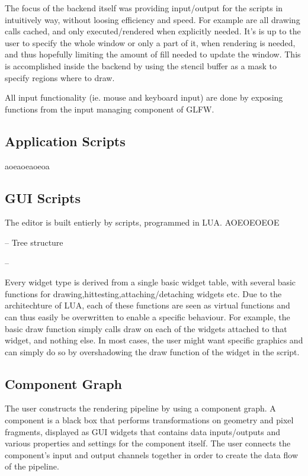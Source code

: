 The focus of the backend itself was providing input/output for the scripts in intuitively way, without loosing efficiency and speed. For example are all drawing calls cached, and only executed/rendered when explicitly needed. It's is up to the user to specify the whole window or only a part of it, when rendering is needed, and thus hopefully limiting the amount of fill needed to update the window. This is accomplished inside the backend by using the stencil buffer as a mask to specify regions where to draw.

All input functionality (ie. mouse and keyboard input) are done by exposing functions from the input managing component of GLFW.

\subsection{Application Scripts}
aoeaoeaoeoa


\subsection{GUI Scripts}

The editor is built entierly by scripts, programmed in LUA. AOEOEOEOE

-- Tree structure


-- 

Every widget type is derived from a single basic widget table, with several basic functions for drawing,hittesting,attaching/detaching widgets etc. Due to the architechture of LUA, each of these functions are seen as virtual functions and can thus easily be overwritten to enable a specific behaviour. For example, the basic draw function simply calls draw on each of the widgets attached to that widget, and nothing else. In most cases, the user might want specific graphics and can simply do so by overshadowing the draw function of the widget in the script. 

\subsection{Component Graph}
The user constructs the rendering pipeline by using a component graph. A component is a black box that performs transformations on geometry and pixel fragments, displayed as GUI widgets that contains data inputs/outputs and various properties and settings for the component itself. The user connects the component’s input and output channels together in order to create the data flow of the pipeline. 

